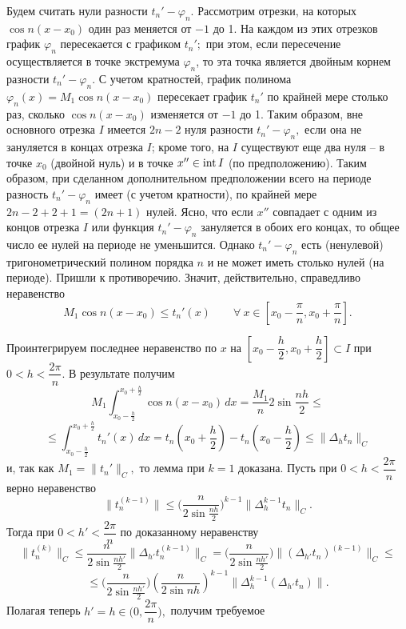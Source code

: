 
 Будем считать нули разности $t_n'-\varphi_n.$  Рассмотрим отрезки, на которых
 $\cos n(x-x_0)$ один раз
 меняется от $-1$ до 1. На каждом из этих отрезков график $\varphi_n$
 пересекается с графиком  $t_n';$
 при этом, если пересечение осуществляется  в точке экстремума $\varphi_n$, то  эта
 точка является двойным корнем разности  $t_n'-\varphi_n.$ С учетом кратностей, график
 полинома $\varphi_n(x)=M_1 \cos n(x-x_0)$
 пересекает график  $t_n'$ {по крайней мере} столько раз, сколько $\cos n(x-x_0)$
 изменяется от $-1$ до 1. Таким образом, вне основного
 отрезка $I$ имеется $2n-2$ нуля разности $t_n'-\varphi_n,$
 {если она не зануляется в концах отрезка $I$;} кроме того,  на $I$
существуют еще два нуля -- в точке $x_0$ (двойной нуль) и в точке {$x''\in {\rm int}\, I$}
 (по предположению). Таким образом, при сделанном дополнительном предположении
 всего на периоде разность $t_n'-\varphi_n$ имеет
 (с учетом кратности), по крайней мере $2n-2+2+1=(2n+1)$
 нулей. {Ясно, что если $x''$ совпадает с одним из концов отрезка $I$ или
 функция $t_n'-\varphi_n$}
 {зануляется в обоих его концах, то общее число ее нулей на периоде
 не уменьшится.}  Однако  $t_n'-\varphi_n$ есть (ненулевой)  тригонометрический
 полином порядка $n$
 и не может иметь столько нулей  (на периоде). Пришли к противоречию. Значит,
 действительно, справедливо неравенство
 $$
 M_1\cos n(x-x_0)\le t_n'(x)\qquad \forall\ x\in
 \left[ x_0-\frac{\pi}{n},x_0+\frac{\pi}{n} \right].
 $$

 Проинтегрируем последнее неравенство по $x$ на
 $ \left[ x_0-\dfrac{h}{2},x_0+\dfrac{h}{2} \right]\subset I$
 при $0<h<\dfrac{2\pi}{n}.$ В результате получим
 $$
 M_1 \int_{x_0-\frac{h}{2}}^{x_0+\frac{h}{2}}\cos n(x-x_0)\, dx=
 \frac{M_1}{n} 2\sin \frac{nh}{2}\le
 $$
 $$
 \le \int_{x_0-\frac{h}{2}}^{x_0+\frac{h}{2}} t_n'(x)\, dx=
 t_n\left(x_0+\frac{h}{2}\right)- t_n\left(x_0-\frac{h}{2}\right)\le
 \|\Delta_ht_n\|_C
 $$
 и, так как $M_1=\|t_n'\|_C,$ то лемма при $k=1$ доказана.
 Пусть при $0<h<\dfrac{2\pi}{n}$ верно неравенство
 $$
 \|t_n^{(k-1)}\|\le \bigg( \dfrac{n}{2\sin\frac{nh}{2}}\bigg)^{k-1}\|\Delta_h^{k-1}
 t_n\|_C.
 $$
 Тогда при $0<h'<\dfrac{2\pi}{n}$ по доказанному
 неравенству
 $$\|t_n^{(k)}\|_C\le \dfrac{n}{2\sin\frac{nh'}{2}}\|\Delta_{h'} t_n^{(k-1)}\|_C=
\bigg(
\dfrac{n}{2\sin\frac{nh'}{2}}\bigg)\|(\Delta_{h'}
t_n)^{(k-1)}\|_C\le
$$
$$
\le \bigg( \dfrac{n}{2\sin\frac{nh'}{2}}\bigg)
\left( \dfrac{n}{2\sin nh}\right)^{k-1}\|\Delta_h^{k-1}(\Delta_{h'} t_n)\|.
$$
Полагая теперь $h'=h\in \Big(0,\dfrac{2\pi}{n}\Big),$
получим требуемое

